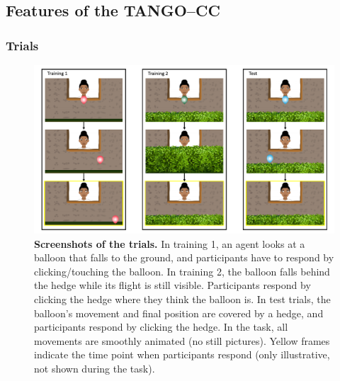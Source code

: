 \documentclass[
  man,floatsintext]{apa7}
\begin{document}
\subsection{Features of the TANGO--CC}\label{features-of-the-tangocc}

\subsubsection{Trials}\label{trials}



\begin{figure}

{\centering \includegraphics[width=1\linewidth]{../figures/tango-cc-procedure} 

}

\caption{\textbf{Screenshots of the trials.} In training 1, an agent looks at a balloon that falls to the ground, and participants have to respond by clicking/touching the balloon. In training 2, the balloon falls behind the hedge while its flight is still visible. Participants respond by clicking the hedge where they think the balloon is. In test trials, the balloon's movement and final position are covered by a hedge, and participants respond by clicking the hedge. In the task, all movements are smoothly animated (no still pictures). Yellow frames indicate the time point when participants respond (only illustrative, not shown during the task).}\label{fig:fig1}
\end{figure}
\end{document}
